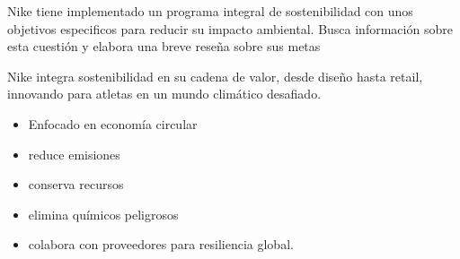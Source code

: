 
%
%
%



\clearpage
{}
\fsection{\boldit{\textcolor{waveBlue2}{Investiga }}}
Nike tiene implementado un programa integral de sostenibilidad con unos objetivos especificos para reducir
su impacto ambiental. Busca información sobre esta cuestión y elabora una breve reseña sobre sus metas

Nike integra sostenibilidad en su cadena de valor, desde diseño hasta retail, innovando para atletas en 
un mundo climático desafiado.
\begin{itemize}[label=$\bullet$]
	\item Enfocado en economía circular
	\item reduce emisiones
	\item conserva recursos 
	\item elimina químicos peligrosos
	\item colabora con proveedores para resiliencia global.
\end{itemize}


